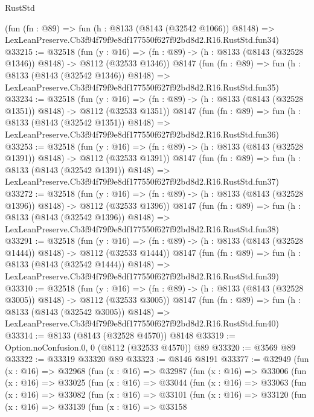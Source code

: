 \begin{lexlean}{RustStd}
\begin{coremodule}
    (fun (fn : @89) =>
    fun (h : @8133 (@8143 (@32542 @1066)) @8148) =>
    LexLeanPreserve.Cb3f94f79f9e8df177550f627f92bd8d2.R16.RustStd.fun34)
@33215 := @32518
    (fun (y : @16) =>
    (fn : @89) -> (h : @8133 (@8143 (@32528 @1346)) @8148) -> @8112 (@32533 @1346))
    @8147
    (fun (fn : @89) =>
    fun (h : @8133 (@8143 (@32542 @1346)) @8148) =>
    LexLeanPreserve.Cb3f94f79f9e8df177550f627f92bd8d2.R16.RustStd.fun35)
@33234 := @32518
    (fun (y : @16) =>
    (fn : @89) -> (h : @8133 (@8143 (@32528 @1351)) @8148) -> @8112 (@32533 @1351))
    @8147
    (fun (fn : @89) =>
    fun (h : @8133 (@8143 (@32542 @1351)) @8148) =>
    LexLeanPreserve.Cb3f94f79f9e8df177550f627f92bd8d2.R16.RustStd.fun36)
@33253 := @32518
    (fun (y : @16) =>
    (fn : @89) -> (h : @8133 (@8143 (@32528 @1391)) @8148) -> @8112 (@32533 @1391))
    @8147
    (fun (fn : @89) =>
    fun (h : @8133 (@8143 (@32542 @1391)) @8148) =>
    LexLeanPreserve.Cb3f94f79f9e8df177550f627f92bd8d2.R16.RustStd.fun37)
@33272 := @32518
    (fun (y : @16) =>
    (fn : @89) -> (h : @8133 (@8143 (@32528 @1396)) @8148) -> @8112 (@32533 @1396))
    @8147
    (fun (fn : @89) =>
    fun (h : @8133 (@8143 (@32542 @1396)) @8148) =>
    LexLeanPreserve.Cb3f94f79f9e8df177550f627f92bd8d2.R16.RustStd.fun38)
@33291 := @32518
    (fun (y : @16) =>
    (fn : @89) -> (h : @8133 (@8143 (@32528 @1444)) @8148) -> @8112 (@32533 @1444))
    @8147
    (fun (fn : @89) =>
    fun (h : @8133 (@8143 (@32542 @1444)) @8148) =>
    LexLeanPreserve.Cb3f94f79f9e8df177550f627f92bd8d2.R16.RustStd.fun39)
@33310 := @32518
    (fun (y : @16) =>
    (fn : @89) -> (h : @8133 (@8143 (@32528 @3005)) @8148) -> @8112 (@32533 @3005))
    @8147
    (fun (fn : @89) =>
    fun (h : @8133 (@8143 (@32542 @3005)) @8148) =>
    LexLeanPreserve.Cb3f94f79f9e8df177550f627f92bd8d2.R16.RustStd.fun40)
@33314 := @8133 (@8143 (@32528 @4570)) @8148
@33319 := Option.noConfusion.{0, 0} (@8112 (@32533 @4570)) @89
@33320 := @3569 @89
@33322 := @33319 @33320 @89
@33323 := @8146 @8191
@33377 := @32949
    (fun (x : @16) =>
    @32968
      (fun (x : @16) =>
      @32987
        (fun (x : @16) =>
        @33006
          (fun (x : @16) =>
          @33025
            (fun (x : @16) =>
            @33044
              (fun (x : @16) =>
              @33063
                (fun (x : @16) =>
                @33082
                  (fun (x : @16) =>
                  @33101
                    (fun (x : @16) =>
                    @33120
                      (fun (x : @16) =>
                      @33139
                        (fun (x : @16) =>
                        @33158

\end{coremodule}
\end{lexlean}
